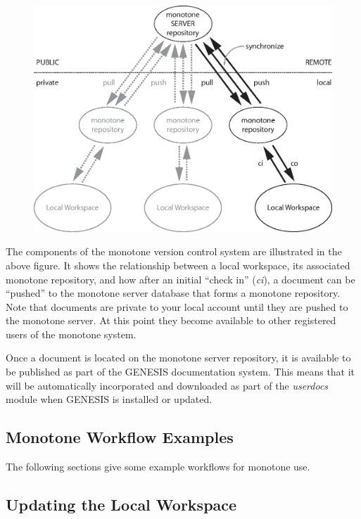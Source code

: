 \documentclass[12pt]{article}
\begin{document}
\begin{figure}[h]
  \centering
 \includegraphics[scale=0.6]{figures/monotone.eps}
  \label{fig:monotone}
\end{figure}

The components of the monotone version control system are illustrated in the above figure. It shows the relationship between a local workspace, its associated monotone repository, and how after an initial ``check in'' ({\it ci}), a document can be ``pushed'' to the monotone server database that forms a monotone repository. Note that documents are private to your local account until they are pushed to the monotone server. At this point they become available to other registered users of the monotone system.

Once a document is located on the monotone server repository, it is available to be published as part of the GENESIS documentation system. This means that it will be automatically incorporated and downloaded as part of the {\it userdocs} module when GENESIS is installed or updated.

\subsection*{Monotone Workflow Examples}

The following sections give some example workflows for monotone use. 

\subsection*{Updating the Local Workspace}
\end{document}
